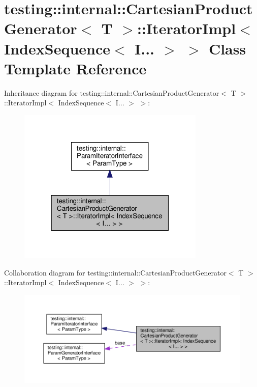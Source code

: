 \hypertarget{classtesting_1_1internal_1_1CartesianProductGenerator_1_1IteratorImpl_3_01IndexSequence_3_01I_8_8_8_01_4_01_4}{}\section{testing\+:\+:internal\+:\+:Cartesian\+Product\+Generator$<$ T $>$\+:\+:Iterator\+Impl$<$ Index\+Sequence$<$ I... $>$ $>$ Class Template Reference}
\label{classtesting_1_1internal_1_1CartesianProductGenerator_1_1IteratorImpl_3_01IndexSequence_3_01I_8_8_8_01_4_01_4}


Inheritance diagram for testing\+:\+:internal\+:\+:Cartesian\+Product\+Generator$<$ T $>$\+:\+:Iterator\+Impl$<$ Index\+Sequence$<$ I... $>$ $>$\+:\nopagebreak
\begin{figure}[H]
\begin{center}
\leavevmode
\includegraphics[width=253pt]{classtesting_1_1internal_1_1CartesianProductGenerator_1_1IteratorImpl_3_01IndexSequence_3_01I_8_8_8_01_4_01_4__inherit__graph}
\end{center}
\end{figure}


Collaboration diagram for testing\+:\+:internal\+:\+:Cartesian\+Product\+Generator$<$ T $>$\+:\+:Iterator\+Impl$<$ Index\+Sequence$<$ I... $>$ $>$\+:\nopagebreak
\begin{figure}[H]
\begin{center}
\leavevmode
\includegraphics[width=350pt]{classtesting_1_1internal_1_1CartesianProductGenerator_1_1IteratorImpl_3_01IndexSequence_3_01I_8_8_8_01_4_01_4__coll__graph}
\end{center}
\end{figure}
